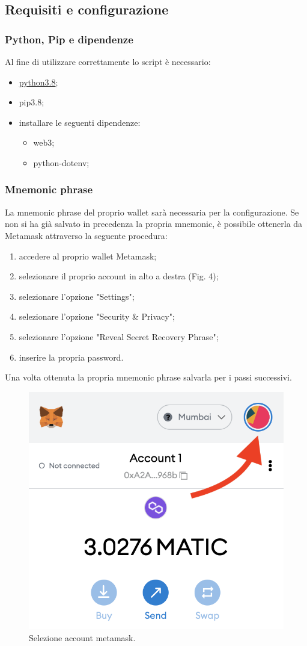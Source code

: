 \documentclass[a4paper, 12pt]{article}
\begin{document}
\subsection{Requisiti e configurazione}
\subsubsection{Python, Pip e dipendenze}
Al fine di utilizzare correttamente lo script è necessario:
\begin{itemize}
  \item \href{https://www.python.org/downloads/}{python3.8};
  \item pip3.8;
  \item installare le seguenti dipendenze:
  \begin{itemize}
    \item web3;
    \item python-dotenv;
  \end{itemize}
\end{itemize}
\subsubsection{Mnemonic phrase}
\label{sec:mnemonic}
La mnemonic phrase del proprio wallet sarà necessaria per la configurazione. Se non si ha già salvato in precedenza la propria mnemonic, è possibile ottenerla da Metamask attraverso la seguente procedura:
\begin{enumerate}
  \item accedere al proprio wallet Metamask;
  \item selezionare il proprio account in alto a destra (Fig. 4);
  \item selezionare l'opzione "Settings";
  \item selezionare l'opzione "Security \& Privacy";
  \item selezionare l'opzione "Reveal Secret Recovery Phrase";
  \item inserire la propria password.
\end{enumerate}
Una volta ottenuta la propria mnemonic phrase salvarla per i passi successivi.
\FloatBarrier
\begin{figure}[!h]
\centering
\includegraphics[width=0.4\linewidth]{img/account_meta.png}
\caption{Selezione account metamask.}
\end{figure}
\FloatBarrier
\end{document}

